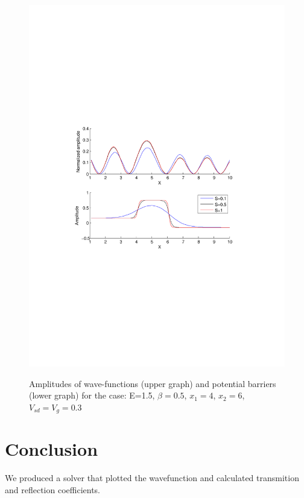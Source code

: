 \documentclass[•]{beamer}
\theoremstyle{remark}
\begin{document}
\begin{frame}
\begin{figure}
\centering
\caption{Amplitudes of wave-functions (upper graph) and potential barriers (lower graph) for the case: E=1.5, $\beta=0.5$, $x_1=4$, $x_2=6$, $V_{sd}=V_g=0.3$}
\includegraphics[scale=0.4, trim = 0mm 20mm 0mm 60mm, clip]{test3}
\label{fig:test3}
\end{figure}
\end{frame}

\section{Conclusion}
\begin{frame}
\begin{block}

We produced a solver that plotted the wavefunction and calculated transmition and reflection coefficients.
\end{block}
\end{frame}
\end{document}
